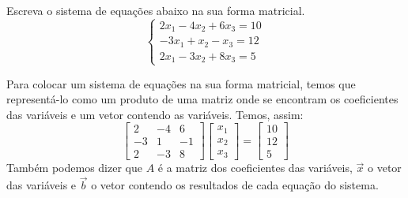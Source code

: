 \begin{exeresol}
Escreva o sistema de equações abaixo na sua forma matricial.
\begin{equation}
 \left\{
  \begin{array}{ll}
    2x_1 - 4x_2 + 6x_3 = 10 \\
    -3x_1 + x_2 - x_3 = 12 \\
    2x_1 - 3x_2 + 8x_3 = 5
  \end{array}\right.
\end{equation}
\end{exeresol}
\begin{resol}
Para colocar um sistema de equações na sua forma matricial, temos que representá-lo como um produto de uma matriz onde se encontram os coeficientes das variáveis e um vetor contendo as variáveis. Temos, assim:
\begin{equation}
 \left[
  \begin{array}{ccc}
    2 & -4 & 6  \\
    -3 & 1 & -1  \\
    2 & -3 & 8
  \end{array}
\right]
\left[
  \begin{array}{c}
   x_1 \\
   x_2 \\
   x_3 
  \end{array}
  \right] = 
\left[
  \begin{array}{c}
   10 \\
   12 \\
   5
  \end{array}
\right]
\end{equation}
Também podemos dizer que $A$ é a matriz dos coeficientes das variáveis, $\vec{x}$ o vetor das variáveis e $\vec{b}$ o vetor contendo os resultados de cada equação do sistema.
\end{resol}













